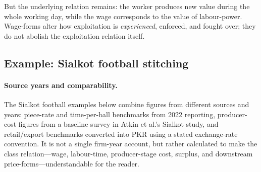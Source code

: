 But the underlying relation remains: the worker produces new value during the whole
working day, while the wage corresponds to the value of labour-power. Wage-forms alter
how exploitation is \emph{experienced}, enforced, and fought over; they do not abolish
the exploitation relation itself.

\subsection{Example: Sialkot football stitching}
\label{subsec:sialkot-football-stitching}

\paragraph{Source years and comparability.}
The Sialkot football examples below combine figures from different sources and
years: piece-rate and time-per-ball benchmarks from 2022 reporting, producer-cost
figures from a baseline survey in 
Atkin et al.'s Sialkot study, and retail/export
benchmarks converted into PKR using a stated exchange-rate convention. It is not a
single firm-year account, but rather calculated to make the class
relation---wage, labour-time, producer-stage cost, surplus, and downstream
price-forms---understandable for the reader.

